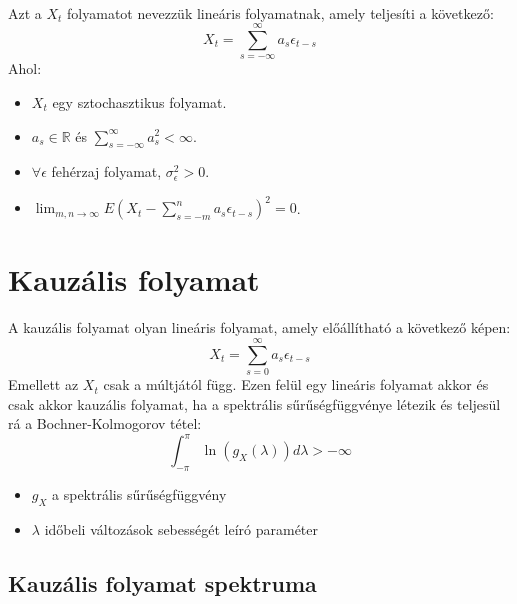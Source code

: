 \documentclass[11pt,a4paper]{article}
\begin{document}
			\paragraph{}
				Azt a $X_t$ folyamatot nevezzük lineáris folyamatnak, amely teljesíti a következő:
				$$X_t = \sum_{s= -\infty}^{\infty} a_s \epsilon_{t-s}$$
				Ahol:
				\begin{itemize}
					\item $X_t$ egy sztochasztikus folyamat.
					\item $a_s \in \mathbb{R}$ és $\sum_{s = - \infty}^{\infty} a_s^2 < \infty$.
					\item $\forall \epsilon$ fehérzaj folyamat, $\sigma_\epsilon^2 > 0$.
					\item $\lim_{m,n \to \infty} E \left(X_t - \sum_{s = -m}^n a_s \epsilon_{t-s} \right)^2 = 0$.
				\end{itemize}

			\section{Kauzális folyamat}
				\paragraph{}
					A kauzális folyamat olyan lineáris folyamat, amely előállítható a következő képen:
					$$X_t = \sum_{s=0}^\infty a_s \epsilon_{t-s}$$
					Emellett az $X_t$ csak a múltjától függ. Ezen felül egy lineáris folyamat akkor és csak akkor kauzális folyamat, ha a spektrális sűrűségfüggvénye létezik és teljesül rá a Bochner-Kolmogorov tétel:
					$$\int_{-\pi}^\pi \ln(g_X(\lambda)) d\lambda > -\infty$$
					\begin{itemize}
						\item $g_X$ a spektrális sűrűségfüggvény
						\item $\lambda$ időbeli változások sebességét leíró paraméter
					\end{itemize}
					

				\subsection{Kauzális folyamat spektruma}
\end{document}
